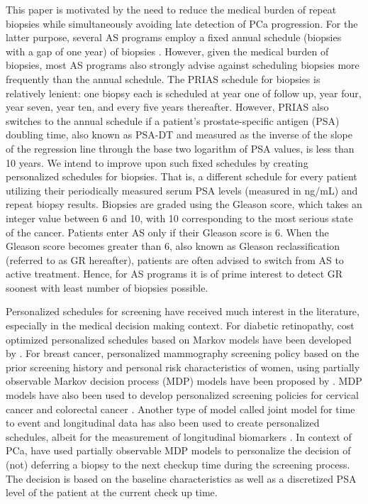 This paper is motivated by the need to reduce the medical burden of repeat biopsies while simultaneously avoiding late detection of PCa progression. For the latter purpose, several AS programs employ a fixed annual schedule (biopsies with a gap of one year) of biopsies \citep{tosoian2011active,welty2015extended}. However, given the medical burden of biopsies, most AS programs also strongly advise against scheduling biopsies more frequently than the annual schedule. The PRIAS schedule for biopsies is relatively lenient: one biopsy each is scheduled at year one of follow up, year four, year seven, year ten, and every five years thereafter. However, PRIAS also switches to the annual schedule if a patient's prostate-specific antigen (PSA) doubling time, also known as PSA-DT and measured as the inverse of the slope of the regression line through the base two logarithm of PSA values, is less than 10 years. We intend to improve upon such fixed schedules by creating personalized schedules for biopsies. That is, a different schedule for every patient utilizing their periodically measured serum PSA levels (measured in ng/mL) and repeat biopsy results. Biopsies are graded using the Gleason score, which takes an integer value between 6 and 10, with 10 corresponding to the most serious state of the cancer. Patients enter AS only if their Gleason score is 6. When the Gleason score becomes greater than 6, also known as Gleason reclassification (referred to as GR hereafter), patients are often advised to switch from AS to active treatment. Hence, for AS programs it is of prime interest to detect GR soonest with least number of biopsies possible.

Personalized schedules for screening have received much interest in the literature, especially in the medical decision making context. For diabetic retinopathy, cost optimized personalized schedules based on Markov models have been developed by \citet{bebu2017OptimalScreening}. For breast cancer, personalized mammography screening policy based on the prior screening history and personal risk characteristics of women, using partially observable Markov decision process (MDP) models have been proposed by \citet*{ayer2012or}. MDP models have also been used to develop personalized screening policies for cervical cancer \citep*{akhavan2017markov} and colorectal cancer \citep*{erenay2014optimizing}. Another type of model called joint model for time to event and longitudinal data \citep{tsiatis2004joint,rizopoulos2012joint} has also been used to create personalized schedules, albeit for the measurement of longitudinal biomarkers \citep{drizopoulosPersScreening}. In context of PCa, \citet{zhang2012optimization} have used partially observable MDP models to personalize the decision of (not) deferring a biopsy to the next checkup time during the screening process. The decision is based on the baseline characteristics as well as a discretized PSA level of the patient at the current check up time.

